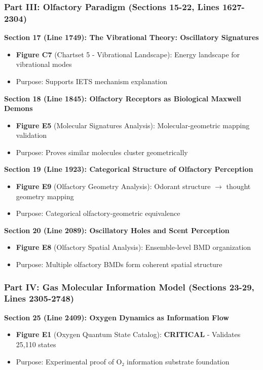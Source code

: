 \documentclass[11pt]{article}
\begin{document}
\subsubsection{Part III: Olfactory Paradigm (Sections 15-22, Lines 1627-2304)}

\textbf{Section 17 (Line 1749): The Vibrational Theory: Oscillatory Signatures}
\begin{itemize}
\item \textbf{Figure C7} (Chartset 5 - Vibrational Landscape): Energy landscape for vibrational modes
\item Purpose: Supports IETS mechanism explanation
\end{itemize}

\textbf{Section 18 (Line 1845): Olfactory Receptors as Biological Maxwell Demons}
\begin{itemize}
\item \textbf{Figure E5} (Molecular Signatures Analysis): Molecular-geometric mapping validation
\item Purpose: Proves similar molecules cluster geometrically
\end{itemize}

\textbf{Section 19 (Line 1923): Categorical Structure of Olfactory Perception}
\begin{itemize}
\item \textbf{Figure E9} (Olfactory Geometry Analysis): Odorant structure $\to$ thought geometry mapping
\item Purpose: Categorical olfactory-geometric equivalence
\end{itemize}

\textbf{Section 20 (Line 2089): Oscillatory Holes and Scent Perception}
\begin{itemize}
\item \textbf{Figure E8} (Olfactory Spatial Analysis): Ensemble-level BMD organization
\item Purpose: Multiple olfactory BMDs form coherent spatial structure
\end{itemize}

\subsubsection{Part IV: Gas Molecular Information Model (Sections 23-29, Lines 2305-2748)}

\textbf{Section 25 (Line 2409): Oxygen Dynamics as Information Flow}
\begin{itemize}
\item \textbf{Figure E1} (Oxygen Quantum State Catalog): \textbf{CRITICAL} - Validates 25,110 states
\item Purpose: Experimental proof of O₂ information substrate foundation
\end{itemize}
\end{document}
